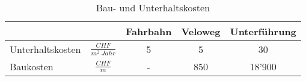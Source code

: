%
%
%
%

\begin{table}[h!]
\flushleft
\renewcommand{\arraystretch}{1.4}

\begin{tabular}{ @{} lc|ccc @{} }
                 &                         & Fahrbahn  & Veloweg  & Unterführung \\ \hline
Unterhaltskosten &$\frac{CHF}{m^2 \ Jahr}$ &     5     &     5    &      30        \\
Baukosten        &$\frac{CHF}{m}$ 		   &     -     &   850    &     18'900        
\end{tabular}
\caption{Bau- und Unterhaltskosten}
\label{tab:t-04-03-01-Unterhalt}
\end{table}

%
%





%


